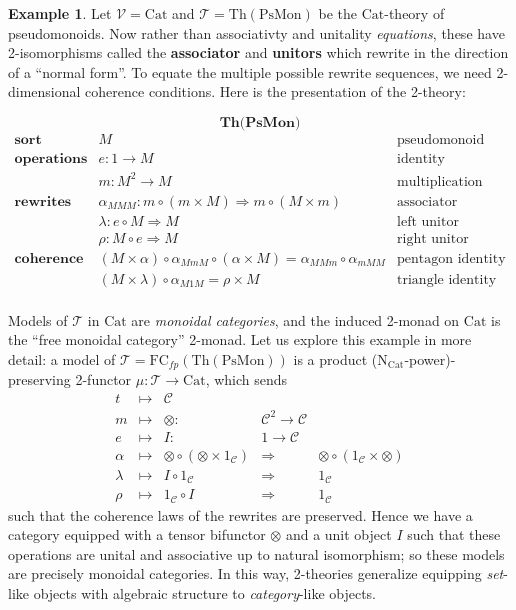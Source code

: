 \documentclass{amsart}
\theoremstyle{definition}
\newtheorem*{example*}{Example}
\newcommand{\Th}{\mathrm{Th}}
\newcommand{\Cat}{\mathrm{Cat}}
\newcommand{\FC}{\mathrm{FC}}
\newcommand{\NN}{\mathrm{N}}
\newcommand{\V}{\mathscr{V}}
\newcommand{\C}{\mathscr{C}}
\newcommand{\T}{\mathscr{T}}
\newcommand{\maps}{\colon}
\begin{document}
\begin{example*}
	Let $\V = \Cat$ and $\T = \Th(\mathrm{PsMon})$ be the $\Cat$-theory of pseudomonoids. Now rather than associativty and unitality \textit{equations}, these have 2-isomorphisms called the \textbf{associator} and \textbf{unitors} which rewrite in the direction of a ``normal form''. To equate the multiple possible rewrite sequences, we need 2-dimensional coherence conditions. Here is the presentation of the 2-theory:
	
	$$\textbf{Th(PsMon)}$$
	\[\begin{array}{rll}
	\textbf{sort} & M & \text{pseudomonoid}\\
	\textbf{operations} & e\maps1 \to M & \text{identity}\\
	& m\maps M^2 \to M & \text{multiplication}\\
	\textbf{rewrites} & \alpha_{MMM}: m \circ (m \times M) \Rightarrow m \circ (M \times m) & \text{associator}\\
	& \lambda\maps e \circ M \Rightarrow M & \text{left unitor}\\
	& \rho\maps M\circ e \Rightarrow M & \text{right unitor}\\
	\textbf{coherence} & (M\times\alpha)\circ \alpha_{MmM}\circ (\alpha\times M) = \alpha_{MMm}\circ \alpha_{mMM} & \text{pentagon identity}\\
	& (M\times \lambda) \circ \alpha_{M1M} = \rho\times M & \text{triangle identity}\\
	\end{array}\]
\end{example*}

Models of $\T$ in $\Cat$ are \textit{monoidal categories}, and the induced 2-monad on $\Cat$ is the ``free monoidal category'' 2-monad. Let us explore this example in more detail: a model of $\T = \FC_{fp}(\Th(\mathrm{PsMon}))$ is a product ($\NN_\Cat$-power)-preserving 2-functor $\mu: \T\to \Cat$, which sends 
\[\begin{array}{rclcl}
	t & \mapsto & \C &&\\
	m & \mapsto & \otimes\maps & \C^2 \to \C &\\
	e & \mapsto & I\maps & 1\to \C &\\
	\alpha & \mapsto & \otimes \circ (\otimes \times 1_\C) & \Rightarrow & \otimes \circ (1_\C \times \otimes)\\
	\lambda & \mapsto & I\circ 1_\C & \Rightarrow & 1_\C\\
	\rho & \mapsto & 1_\C \circ I & \Rightarrow & 1_\C
\end{array}\]
such that the coherence laws of the rewrites are preserved. Hence we have a category equipped with a tensor bifunctor $\otimes$ and a unit object $I$ such that these operations are unital and associative up to natural isomorphism; so these models are precisely monoidal categories. In this way, 2-theories generalize equipping \textit{set}-like objects with algebraic structure to \textit{category}-like objects.
\end{document}
